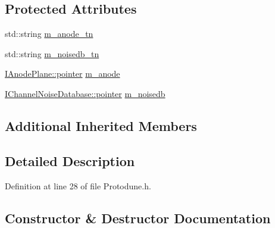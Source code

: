 \subsection*{Protected Attributes}
\begin{DoxyCompactItemize}
\item 
std\+::string \hyperlink{class_wire_cell_1_1_sig_proc_1_1_protodune_1_1_config_filter_base_ae56db38557652b3c87a209776caf8680}{m\+\_\+anode\+\_\+tn}
\item 
std\+::string \hyperlink{class_wire_cell_1_1_sig_proc_1_1_protodune_1_1_config_filter_base_a7db12939221989208e6ebc9340e18581}{m\+\_\+noisedb\+\_\+tn}
\item 
\hyperlink{class_wire_cell_1_1_i_component_a744b962ee9489c909f1b0f1fe2533798}{I\+Anode\+Plane\+::pointer} \hyperlink{class_wire_cell_1_1_sig_proc_1_1_protodune_1_1_config_filter_base_a913bad0068f27d0e77626b812be512a9}{m\+\_\+anode}
\item 
\hyperlink{class_wire_cell_1_1_i_component_a744b962ee9489c909f1b0f1fe2533798}{I\+Channel\+Noise\+Database\+::pointer} \hyperlink{class_wire_cell_1_1_sig_proc_1_1_protodune_1_1_config_filter_base_a26a540a159b64fc2633fbf8566ba616c}{m\+\_\+noisedb}
\end{DoxyCompactItemize}
\subsection*{Additional Inherited Members}


\subsection{Detailed Description}


Definition at line 28 of file Protodune.\+h.



\subsection{Constructor \& Destructor Documentation}
\mbox{\label{class_wire_cell_1_1_sig_proc_1_1_protodune_1_1_config_filter_base_ac4e78e426df5a24a4b8638597f0ab6d1}} 
